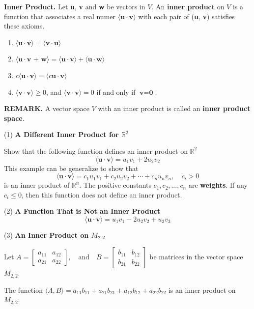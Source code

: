 \documentclass{article}
\newcounter{example}[section]
\newcommand\B{\textbf}
\newcommand\tcl{\begin{tcolorbox}[colback = {blue9}]}
\newcommand\etcl{\end{tcolorbox}}
\newcommand\R{\mathbb{R}}
\newcommand\la{\langle}
\newcommand\ra{\rangle}
\begin{document}
    \tcl
    \B{Inner Product. } Let \B{u}, \B{v} and \B{w} be vectors in $V$. An \textbf{inner product} on $V$ is a function that
    associates a real numer $\la \B{u} \cdot \B{v} \ra$ with each pair of (\B{u}, \B{v}) satisfies these axioms.
    \begin{enumerate}
        \item $\la \B{u} \cdot \B{v} \ra = \la \B{v} \cdot \B{u} \ra$
        \item $\la \B{u} \cdot \B{v + w} \ra = \la \B{u} \cdot \B{v} \ra + \la \B{u} \cdot \B{w} \ra$
        \item $c\la \B{u} \cdot \B{v} \ra = \la c\B{u} \cdot \B{v} \ra$
        \item $\la \B{v} \cdot \B{v} \ra \ge 0$, and $\la \B{v} \cdot \B{v} \ra = 0$ if and only if $\B{v} = \B{0}$.
    \end{enumerate}
    \etcl 
    \B{REMARK. } A vector space $V$ with an inner product is called an \B{inner product space}.

    (1) \B{A Different Inner Product for $\R^2$}

    Show that the following function defines an inner product on $\R^2$
    \[ \la \B{u} \cdot \B{v} \ra = u_1v_1 + 2u_2v_2 \]
    This example can be generalize to show that
    \[ \la \B{u} \cdot \B{v} \ra = c_1u_1v_1 + c_2u_2v_2 + \cdots + c_nu_nv_n, \quad c_i > 0 \]
    is an inner product of $\R^n$. The positive constants $c_1, c_2, \dots, c_n$ are \B{weights}. If any $c_i \le 0$,
    then this function does not define an inner product.
    
    (2) \B{A Function That is Not an Inner Product}
    \[ \la \B{u} \cdot \B{v} \ra = u_1v_1 - 2u_2v_2 + u_3v_3 \]

    (3) \B{An Inner Product on $M_{2,2}$}

    Let $A = 
        \begin{bmatrix}
            a_{11} & a_{12} \\
            a_{21} & a_{22}
        \end{bmatrix}, \quad \text{and} \quad 
        B =
        \begin{bmatrix}
            b_{11} & b_{12} \\
            b_{21} & b_{22}
        \end{bmatrix}$ be matrices in the vector space $M_{2,2}$. 

        The function
        $ \la A, B \ra = a_{11}b_{11} + a_{21}b_{21} + a_{12}b_{12} + a_{22}b_{22}$ is an inner product on $M_{2,2}$.
\end{document}
